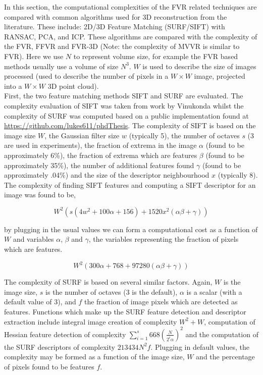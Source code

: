 In this section, the computational complexities of the FVR related techniques are compared with common algorithms used for 3D reconstruction from the literature. These include: 2D/3D Feature Matching (SURF/SIFT) with RANSAC, PCA, and ICP. These algorithms are compared with the complexity of the FVR, FFVR and FVR-3D (Note: the complexity of MVVR is similar to FVR). Here we use $N$ to represent volume size, for example the FVR based methods usually use a volume of size $N^3$. $W$ is used to describe the size of images processed (used to describe the number of pixels in a $W\times W$ image, projected into a $W\times W$ 3D point cloud). \\


First, the two feature matching methods SIFT and SURF are evaluated. The complexity evaluation of SIFT was taken from work by Vinukonda \cite{Vinukonda11Study} whilst the complexity of SURF was computed based on a public implementation found at \url{https://github.com/lukes611/phdThesis}. The complexity of SIFT is based on the image size $W$, the Gaussian filter size $w$ (typically 5), the number of octaves $s$ (3 are used in experiments), the fraction of extrema in the image $\alpha$ (found to be approximately 6\%), the fraction of extrema which are features $\beta$ (found to be approximately 35\%), the number of additional features found $\gamma$ (found to be approximately .04\%) and the size of the descriptor neighbourhood $x$ (typically 8). \\


The complexity of finding SIFT features and computing a SIFT descriptor for an image was found to be,

\begin{equation} \label{eqn:SIFT_PERF}
W^2(s(4w^2 + 100\alpha + 156) + 1520x^2(\alpha \beta + \gamma))
\end{equation}

by plugging in the usual values we can form a computational cost as a function of $W$ and variables $\alpha$, $\beta$ and $\gamma$, the variables representing the fraction of pixels which are features.

\begin{equation} \label{eqn:SIFT_PERF_FINAL}
W^2(300\alpha + 768 + 97280(\alpha \beta + \gamma))
\end{equation}

The complexity of SURF is based on several similar factors. Again, $W$ is the image size, $s$ is the number of octaves (3 is the default), $\alpha$ is a scalar (with a default value of 3), and $f$ the fraction of image pixels which are detected as features. Functions which make up the SURF feature detection and descriptor extraction include integral image creation of complexity $W^2 + W$, computation of Hessian feature detection of complexity $\sum_{i=1}^{s} 668(\frac{N}{2^i\alpha})^2$ and the computation of the SURF descriptors of complexity $213434N^2f$. Plugging in default values, the complexity may be formed as a function of the image size, $W$ and the percentage of pixels found to be features $f$.

